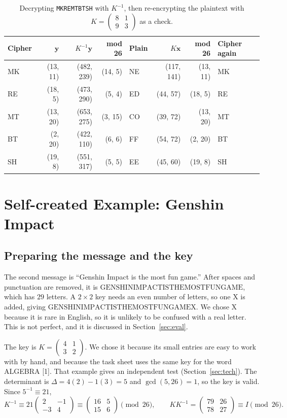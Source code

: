 \documentclass[11pt,a4paper]{article}
\newcommand{\vect}[1]{\begin{pmatrix}#1\end{pmatrix}}
\newcommand{\smat}[1]{\left(\begin{smallmatrix}#1\end{smallmatrix}\right)}
\newcommand{\x}{\mathbf{x}}   %
\newcommand{\y}{\mathbf{y}}   %
\theoremstyle{plain}
\theoremstyle{definition}
\begin{document}
\begin{table}[ht]
\centering
\small
\caption{Decrypting \texttt{MKREMTBTSH} with $K^{-1}$, then re-encrypting the plaintext with $K=\smat{8&1\\9&3}$ as a check.}
\label{tab:peer}
\setlength{\tabcolsep}{5pt}
\begin{tabular}{l r r r l r r l}
\toprule
Cipher & $\y$ & $K^{-1}\y$ & mod 26 & Plain & $K\x$ & mod 26 & Cipher again\\
\midrule
MK & (13, 11) & (482, 239) & (14, 5) & NE & (117, 141) & (13, 11) & MK\\
RE & (18, 5)  & (473, 290) & (5, 4)  & ED & (44, 57)   & (18, 5)  & RE\\
MT & (13, 20) & (653, 275) & (3, 15) & CO & (39, 72)   & (13, 20) & MT\\
BT & (2, 20)  & (422, 110) & (6, 6)  & FF & (54, 72)   & (2, 20)  & BT\\
SH & (19, 8)  & (551, 317) & (5, 5)  & EE & (45, 60)   & (19, 8)  & SH\\
\bottomrule
\end{tabular}
\end{table}


\section{Self-created Example: Genshin Impact}

\subsection{Preparing the message and the key}

The second message is ``Genshin Impact is the most fun game.'' After spaces and punctuation are removed, it is $\text{GENSHINIMPACTISTHEMOSTFUNGAME}$, which has $29$ letters. A $2\times2$ key needs an even number of letters, so one X is added, giving $\text{GENSHINIMPACTISTHEMOSTFUNGAMEX}$. We chose X because it is rare in English, so it is unlikely to be confused with a real letter. This is not perfect, and it is discussed in Section~\ref{sec:eval}.

The key is $K=\smat{4&1\\3&2}$. We chose it because its small entries are easy to work with by hand, and because the task sheet uses the same key for the word ALGEBRA [1]. That example gives an independent test (Section~\ref{sec:tech}). The determinant is $\Delta=4(2)-1(3)=5$ and $\gcd(5,26)=1$, so the key is valid. Since $5^{-1}\equiv21$,
\[
K^{-1}\equiv21\vect{2&-1\\-3&4}\equiv\vect{16&5\\15&6}\pmod{26},
\qquad
KK^{-1}=\vect{79&26\\78&27}\equiv I\pmod{26}.
\]
\end{document}
